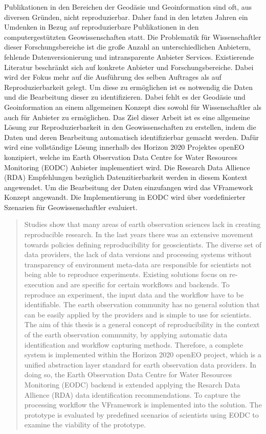 \documentclass[draft,final]{vutinfth} %
\begin{document}
\begin{kurzfassung}
Publikationen in den Bereichen der Geodäsie und Geoinformation sind oft, aus diversen Gründen, nicht reproduzierbar. Daher fand in den letzten Jahren ein Umdenken in Bezug auf reproduzierbare Publikationen in den computergestützten Geowissenschaften statt. Die Problematik für Wissenschaftler dieser Forschungsbereiche ist die große Anzahl an unterschiedlichen Anbietern, fehlende Datenversionierung und intransparente Anbieter Services. Existierende Literatur beschränkt sich auf konkrete Anbieter und Forschungsbereiche. Dabei wird der Fokus mehr auf die Ausführung des selben Auftrages als auf Reproduzierbarkeit gelegt. Um diese zu ermöglichen ist es notwendig die Daten und die Bearbeitung dieser zu identifizieren. Dabei fehlt es der Geodäsie und Geoinformation an einem allgemeinen Konzept dies sowohl für Wissenschaftler als auch für Anbieter zu ermöglichen. Das Ziel dieser Arbeit ist es eine allgemeine Lösung zur Reproduzierbarkeit in den Geowissenschaften zu erstellen, indem die Daten und deren Bearbeitung automatisch identifizierbar gemacht werden. Dafür wird eine vollständige Lösung innerhalb des Horizon 2020 Projektes openEO konzipiert, welche im Earth Observation Data Centre for Water Resources Monitoring (EODC) Anbieter implementiert wird. Die Research Data Allience (RDA) Empfehlungen bezüglich Datenzitierbarkeit werden in diesem Kontext angewendet. Um die Bearbeitung der Daten einzufangen wird das VFramework Konzept angewandt. Die Implementierung in EODC wird über vordefinierter Szenarien für Geowissenschaftler evaluiert.    
\end{kurzfassung}


\begin{abstract}
Studies show that many areas of earth observation sciences lack in creating reproducible research. In the last years there was an extensive movement towards policies defining reproducibility for geoscientists. The diverse set of data providers, the lack of data versions and processing systems without transparency of environment meta-data are responsible for scientists not being able to reproduce experiments. Existing solutions focus on re-execution and are specific for certain workflows and backends. To reproduce an experiment, the input data and the workflow have to be identifiable. The earth observation community has no general solution that can be easily applied by the providers and is simple to use for scientists. The aim of this thesis is a general concept of reproducibility in the context of the earth observation community, by applying automatic data identification and workflow capturing methods. Therefore, a complete system is implemented within the Horizon 2020 openEO project, which is a unified abstraction layer standard for earth observation data providers. In doing so, the Earth Observation Data Centre for Water Resources Monitoring (EODC) backend is extended applying the Resarch Data Allience (RDA) data identification recommendations. To capture the processing workflow the VFramework is implemented into the solution. The prototype is evaluated by predefined scenarios of scientists using EODC to examine the viability of the prototype.    
\end{abstract}
\end{document}
